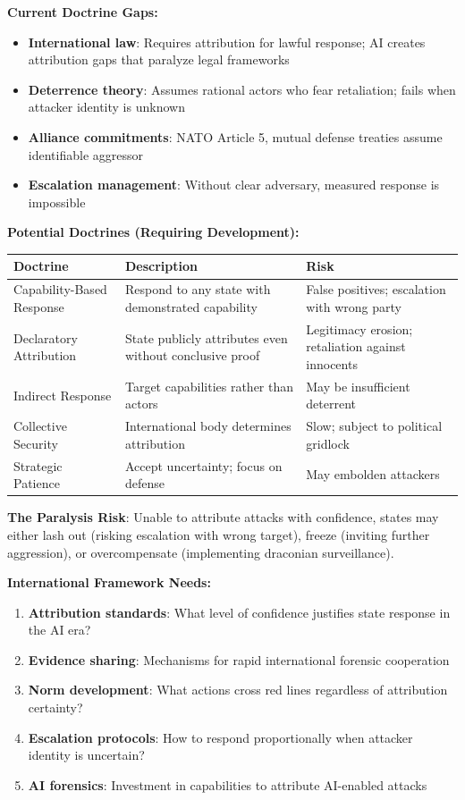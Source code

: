\documentclass[11pt,letterpaper]{article}
\begin{document}
\textbf{Current Doctrine Gaps:}
\begin{itemize}
  \item \textbf{International law}: Requires attribution for lawful response; AI creates attribution gaps that paralyze legal frameworks
  \item \textbf{Deterrence theory}: Assumes rational actors who fear retaliation; fails when attacker identity is unknown
  \item \textbf{Alliance commitments}: NATO Article 5, mutual defense treaties assume identifiable aggressor
  \item \textbf{Escalation management}: Without clear adversary, measured response is impossible
\end{itemize}

\textbf{Potential Doctrines (Requiring Development):}

\begin{center}
\small
\begin{tabular}{L{3cm}L{4.5cm}L{4.5cm}}
\toprule
\textbf{Doctrine} & \textbf{Description} & \textbf{Risk} \\
\midrule
Capability-Based Response & Respond to any state with demonstrated capability & False positives; escalation with wrong party \\
Declaratory Attribution & State publicly attributes even without conclusive proof & Legitimacy erosion; retaliation against innocents \\
Indirect Response & Target capabilities rather than actors & May be insufficient deterrent \\
Collective Security & International body determines attribution & Slow; subject to political gridlock \\
Strategic Patience & Accept uncertainty; focus on defense & May embolden attackers \\
\bottomrule
\end{tabular}
\end{center}

\textbf{The Paralysis Risk}: Unable to attribute attacks with confidence, states may either lash out (risking escalation with wrong target), freeze (inviting further aggression), or overcompensate (implementing draconian surveillance).

\textbf{International Framework Needs:}
\begin{enumerate}
  \item \textbf{Attribution standards}: What level of confidence justifies state response in the AI era?
  \item \textbf{Evidence sharing}: Mechanisms for rapid international forensic cooperation
  \item \textbf{Norm development}: What actions cross red lines regardless of attribution certainty?
  \item \textbf{Escalation protocols}: How to respond proportionally when attacker identity is uncertain?
  \item \textbf{AI forensics}: Investment in capabilities to attribute AI-enabled attacks
\end{enumerate}
\end{document}
